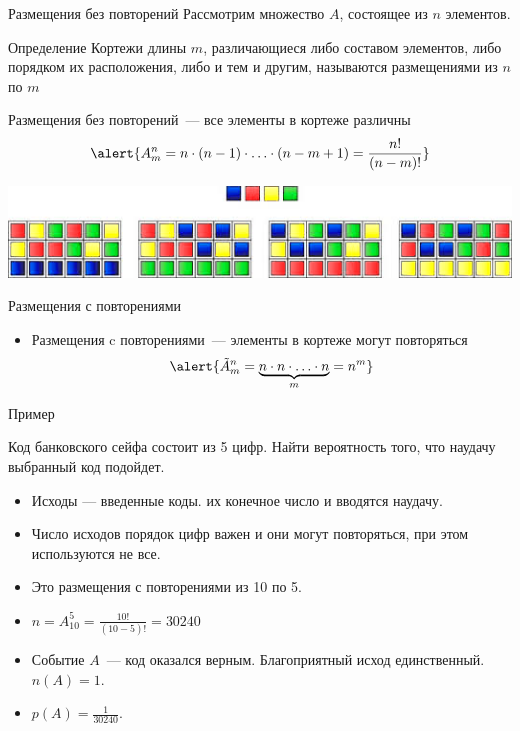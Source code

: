 \documentclass[unicode,11pt,notheorems,xcolor=table]{beamer}
\begin{document}
\begin{frame}{Размещения без повторений}
    Рассмотрим множество $A$, состоящее из $n$ элементов.
    \begin{block}{Определение}
        Кортежи длины $m$,  различающиеся либо составом элементов, либо порядком их расположения, либо и тем и другим, называются \alert{размещениями из $n$ по $m$}
     \end{block}
     \alert{Размещения без повторений}~--- все элементы в кортеже различны 
     $$
        \alert{A^n_m= n\cdot (n-1) \cdot \ldots \cdot (n-m+1) = \frac{n!}{(n-m)!}}
     $$
 
     \medskip


     \includegraphics[width=\textwidth]{allocations.png}
\end{frame}

\begin{frame}{Размещения с повторениями}
    \begin{itemize}
         \item Размещения c повторениями~--- элементы в кортеже могут повторяться
         $$
            \alert{\tilde{A}^n_m= \underbrace{n \cdot n \cdot \ldots \cdot n}_m = n^m}
         $$
     \end{itemize}
\end{frame}
\begin{frame}{Пример}{}
    \begin{exampleblock}{}
        Код банковского сейфа состоит из 5 цифр. Найти вероятность того, что наудачу выбранный код подойдет.
    \end{exampleblock}
    \begin{itemize}
        \item Исходы --- введенные коды. их конечное число и вводятся наудачу.
        \item Число исходов порядок цифр важен и они могут повторяться, при этом используются не все. 
        \item Это размещения с повторениями из 10 по 5.
        \item \alert{$n=A_{10}^5=\frac{10!}{(10-5)!}=30240$}
        \item Событие $A$~--- код оказался верным. Благоприятный исход единственный. \alert{$n(A)=1$}.
        \item \alert{$p(A)=\frac{1}{30240}$}.
    \end{itemize}
\end{frame}
\end{document}
